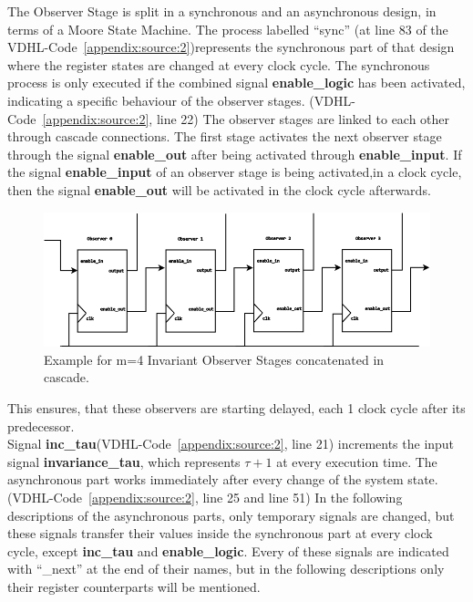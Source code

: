 The Observer Stage is split in a synchronous and an asynchronous design, in terms of a Moore State Machine. 
The process labelled ``sync'' (at line 83 of the VDHL-Code~\ref{appendix:source:2})represents the synchronous part of that design where the register states are changed at every clock cycle. 
The synchronous process is only executed if the combined signal \textbf{enable\_logic} has been activated, indicating a specific behaviour of the observer stages. (VDHL-Code~\ref{appendix:source:2}, line 22)
The observer stages are linked  to each other through cascade connections. The first stage activates the next observer stage through the signal
\textbf{enable\_out} after being activated through \textbf{enable\_input}. 
If the signal \textbf{enable\_input} of an observer stage is being activated,in a clock cycle, then the signal \textbf{enable\_out} will be activated in the clock cycle afterwards. 
%
\begin{center}
\begin{figure}[h]
\includegraphics[width=450px]{Chapter2/Figs/Raster/Observer-stage.png}
\caption[Invariant Observer stages in cascade ,  m=4]{Example for m=4 Invariant Observer Stages concatenated in cascade. }
\label{fig:observerstages}
\end{figure}
\end{center}
This ensures, that these observers are starting delayed, each 1 clock cycle after its predecessor. \\
Signal \textbf{inc\_tau}(VDHL-Code~\ref{appendix:source:2}, line 21) increments the input signal \textbf{invariance\_tau}, which represents $\tau+1$ at every execution time. 
The asynchronous part works immediately after every change of the system state. (VDHL-Code~\ref{appendix:source:2}, line 25 and line 51)
In the following descriptions of the asynchronous parts, only temporary signals are changed, 
but these signals transfer their values inside the synchronous part at every clock cycle, except \textbf{inc\_tau} and \textbf{enable\_logic}. 
Every of these signals are indicated with ``\_next'' at the end of their names, but in the following descriptions only their register counterparts will be mentioned. 
